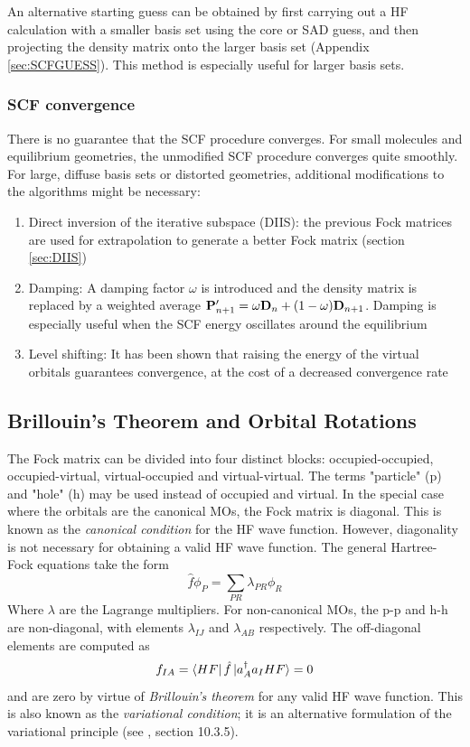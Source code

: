 An alternative starting guess can be obtained by first carrying out a HF calculation with a smaller basis set using the core or SAD guess, and then projecting the density matrix onto the larger basis set (Appendix \ref{sec:SCFGUESS}). This method is especially useful for larger basis sets.  

\subsubsection{SCF convergence}

There is no guarantee that the SCF procedure converges. For small molecules and equilibrium geometries, the unmodified SCF procedure converges quite smoothly. For large, diffuse basis sets or distorted geometries, additional modifications to the algorithms might be necessary:
\begin{enumerate}
\item Direct inversion of the iterative subspace (DIIS): the previous Fock matrices are used for extrapolation to generate a better Fock matrix (section \ref{sec:DIIS})
\item Damping: A damping factor $\omega$ is introduced and the density matrix is replaced by a weighted average $\mathbf{P}'_{n+1} = \omega \mathbf{D}_n + (1-\omega)\mathbf{D}_{n+1}$. Damping is especially useful when the SCF energy oscillates around the equilibrium
\item Level shifting: It has been shown that raising the energy of the virtual orbitals guarantees convergence, at the cost of a decreased convergence rate
\end{enumerate} 

\subsection{Brillouin's Theorem and Orbital Rotations}

The Fock matrix can be divided into four distinct blocks: occupied-occupied, occupied-virtual, virtual-occupied and virtual-virtual. The terms "particle" (p) and "hole" (h) may be used instead of occupied and virtual. In the special case where the orbitals are the canonical MOs, the Fock matrix is diagonal. This is known as the \emph{canonical condition} for the HF wave function. However, diagonality is not necessary for obtaining a valid HF wave function. The general Hartree-Fock equations take the form
\begin{equation}
\hat{f} \phi_P = \sum_{PR} \lambda_{PR} \phi_R
\end{equation}
\noindent Where $\lambda$ are the Lagrange multipliers. For non-canonical MOs, the p-p and h-h are non-diagonal, with elements $\lambda_{IJ}$ and $\lambda_{AB}$ respectively. The off-diagonal elements are computed as
\begin{equation}
f_{IA} = \bra{\smash{HF}}\hat{f}\ket{\smash{a^{\dagger}_A a_I HF}} = 0
\end{equation}
\noindent and are zero by virtue of \emph{Brillouin's theorem} for any valid HF wave function. This is also known as the \emph{variational condition}; it is an alternative formulation of the variational principle (see \cite{Hel2000}, section 10.3.5).

